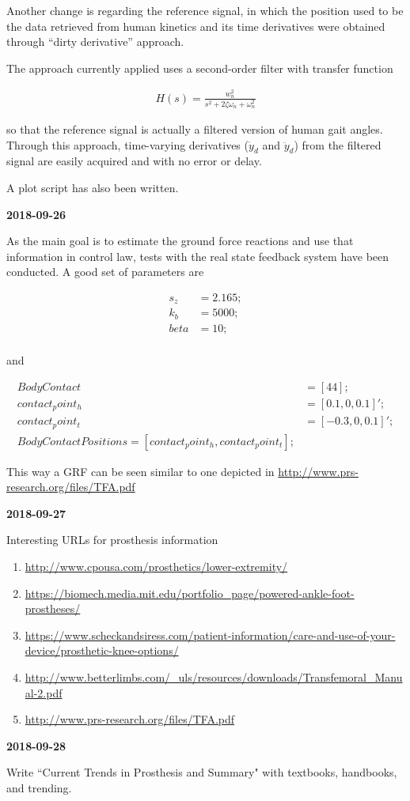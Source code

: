 Another change is regarding the reference signal, in which the position used to be the data retrieved from human kinetics and its time derivatives were obtained through ``dirty derivative'' approach.

The approach currently applied uses a second-order filter with transfer function

\begin{align}
	H(s) = \frac{w_{n}^2}{s^2 + 2\zeta \omega_n + \omega_n^2}
\end{align}

so that the reference signal is actually a filtered version of human gait angles. Through this approach, time-varying derivatives ($\dot{y}_d$ and $\ddot{y}_d$) from the filtered signal are easily acquired and with no error or delay.

A plot script has also been written.

\textbf{2018-09-26}

As the main goal is to estimate the ground force reactions and use that information in control law, tests with the real state feedback system have been conducted. A good set of parameters are 

\begin{align}
s_z &= 2.165 ; \\%
k_b &= 5000; \\%
beta &= 10; \\%
\end{align}

and 

\begin{align}
BodyContact &= [ 4 4 ]; \\%
contact_point_h &= [  0.1, 0, 0.1 ]'; \\%
contact_point_t &= [ -0.3, 0, 0.1 ]'; \\%
BodyContactPositions = [ contact_point_h, contact_point_t ];
\end{align}

This way a GRF can be seen similar to one depicted in \url{http://www.prs-research.org/files/TFA.pdf}

\textbf{2018-09-27}

Interesting URLs for prosthesis information
\begin{enumerate}
    \item \url{http://www.cpousa.com/prosthetics/lower-extremity/}
    \item \url{https://biomech.media.mit.edu/portfolio_page/powered-ankle-foot-prostheses/}
    \item \url{https://www.scheckandsiress.com/patient-information/care-and-use-of-your-device/prosthetic-knee-options/}
    \item \url{http://www.betterlimbs.com/_uls/resources/downloads/Transfemoral_Manual-2.pdf}
    \item \url{http://www.prs-research.org/files/TFA.pdf}
\end{enumerate}

\textbf{2018-09-28}

Write ``Current Trends in Prosthesis and Summary" with textbooks, handbooks, and trending.


